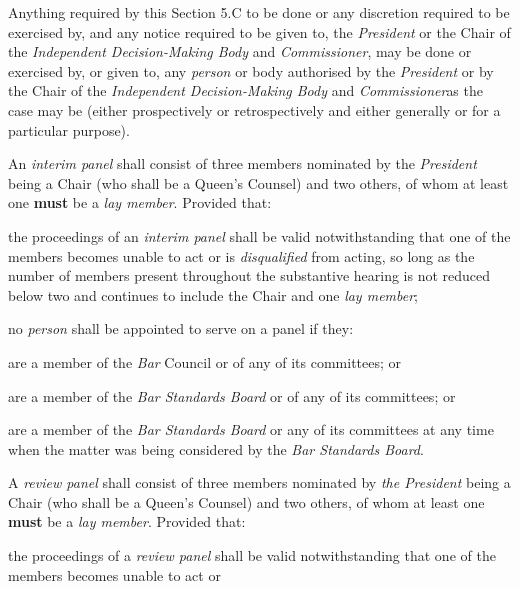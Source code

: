 \par
Anything required by this Section 5.C to be done or any discretion
required to be exercised by, and any notice required to be given to,
the \emph{President} or the Chair of the \emph{Independent
Decision-Making Body }and\emph{ Commissioner}, may be done or exercised
by, or given to, any \emph{person} or body authorised by
the \emph{President} or by the Chair of the \emph{Independent
Decision-Making Body }and\emph{ Commissioner}as the case may be (either
prospectively or retrospectively and either generally or for a
particular purpose).\\
\par
{}
An \emph{interim panel} shall consist of three members nominated by
the \emph{President} being a Chair (who shall be a Queen's Counsel) and
two others, of whom at least one  \textcolor{myred}{\textbf{must}} be a \emph{lay member}. Provided
that:\\\nl \item the proceedings of an \emph{interim panel} shall be valid
notwithstanding that one of the members becomes unable to act or
is \emph{disqualified} from acting, so long as the number of members
present throughout the substantive hearing is not reduced below two and
continues to include the Chair and one \emph{lay member};\item no \emph{person} shall be appointed to serve on a panel if they:\al
\item are a member of the \emph{Bar }Council or of any of its committees;
or\\
\item are a member of the \emph{Bar Standards Board} or of any of its
committees; or\\
\item are a member of the \emph{Bar Standards Board} or any of its
committees at any time when the matter was being considered by
the \emph{Bar Standards Board}.\la\ln
{}\par
A \emph{review panel} shall consist of three members nominated
by \emph{the President} being a Chair (who shall be a Queen's Counsel)
and two others, of whom at least one  \textcolor{myred}{\textbf{must}} be a \emph{lay member}.
Provided that:\\\nl \item the proceedings of a \emph{review panel} shall be valid
notwithstanding that one of the members becomes unable to act or
